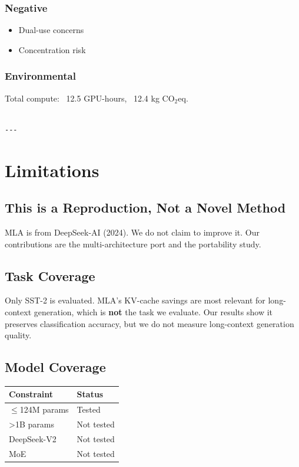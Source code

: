 \subsubsection{Negative}
\begin{itemize}
\item Dual-use concerns
\item Concentration risk

\end{itemize}
\subsubsection{Environmental}
Total compute: ~12.5 GPU-hours, ~12.4 kg CO$_2$eq.
\begin{lstlisting}

---
\end{lstlisting}


\section{Limitations}

\subsection{This is a Reproduction, Not a Novel Method}

MLA is from DeepSeek-AI (2024). We do not claim to improve it. Our 
contributions are the multi-architecture port and the portability study.

\subsection{Task Coverage}

Only SST-2 is evaluated. MLA's KV-cache savings are most relevant for 
long-context generation, which is \textbf{not} the task we evaluate. Our results 
show it preserves classification accuracy, but we do not measure 
long-context generation quality.

\subsection{Model Coverage}

\begin{table}[H]
\centering
\small
\begin{tabular}{ll}
\toprule
\textbf{Constraint} & \textbf{Status} \\
\midrule
$\le$124M params & Tested \\
\textgreater{}1B params & Not tested \\
DeepSeek-V2 & Not tested \\
MoE & Not tested \\
\bottomrule
\end{tabular}
\end{table}

